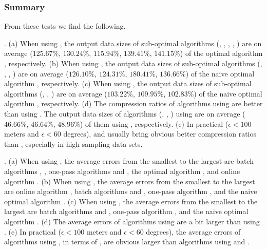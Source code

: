 \subsubsection{Summary}
From these tests we find the following.

\emph{}.
(a) When using \ped, the output data sizes of sub-optimal algorithms (\tpa,
\dpa, \bqsa, \siped, \operb) are on average ($125.67\%$, $130.24\%$, $115.94\%$, $139.41\%$, $141.15\%$)
of the optimal algorithm \opt, respectively.
(b) When using \sed, the output data sizes of sub-optimal algorithms (\tpa,
\dpa, \squishe, \cised) are on average ($126.10\%$, $124.31\%$, $180.41\%$, $136.66\%$) of the naive optimal algorithm \opt, respectively.
(c) When using \dad, the output data sizes of sub-optimal algorithms (\tpa,
\dpa, \interval) are on average ($103.22\%$, $109.95\%$, $102.83\%$) of the naive optimal algorithm \opt, respectively.
(d) The compression ratios of algorithms using \ped are better than
using \sed. The output data sizes of algorithms (\opt, \tpa, \dpa) using \ped
are on average ($46.66\%$, $46.64\%$, $48.96\%$) of them using \sed, respectively.
(e) In practical (\eg $\epsilon <100$ meters and $\epsilon < 60$ degrees), \ped and \sed usually bring obvious better compression ratios than \dad, especially in high sampling data sets.

\emph{}.
(a) When using \ped, the average errors from the smallest to the largest are batch algorithms \tpa, \dpa, one-pass algorithms \siped and \operb, the optimal algorithm \opt, and online algorithm \bqsa.
(b) When using \sed, the average errors from the smallest to the largest are online algorithm \squishe, batch algorithms \tpa and \dpa, one-pass algorithm \cised, and the naive optimal algorithm \opt.
(c) When using \dad, the average errors from the smallest
to the largest are batch algorithms \dpa and \tpa, one-pass algorithm \interval, and the naive optimal algorithm \opt.
(d) The average errors of algorithms using \sed are a bit larger than using \ped.
(e) In practical (\eg $\epsilon <100$ meters and $\epsilon < 60$ degrees), the average errors of algorithms using \dad, in terms of \ped, are obvious larger than algorithms using \ped and \sed.

